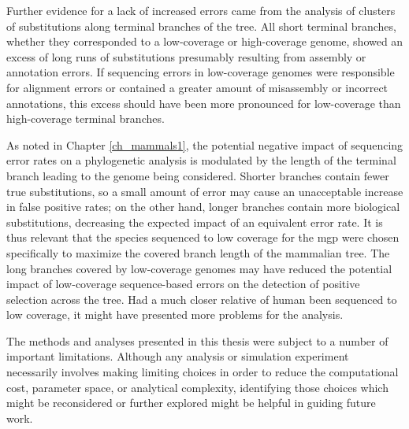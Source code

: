 Further evidence for a lack of increased errors came from the analysis
of clusters of \nsyn substitutions along terminal branches of the
tree. All short terminal branches, whether they corresponded to a
low-coverage or high-coverage genome, showed an excess of long runs of
\nsyn substitutions presumably resulting from assembly or annotation
errors. If sequencing errors in low-coverage genomes were responsible
for alignment errors or contained a greater amount of misassembly or
incorrect annotations, this excess should have been more pronounced
for low-coverage than high-coverage terminal branches.

As noted in Chapter \ref{ch_mammals1}, the potential negative impact
of sequencing error rates on a phylogenetic analysis is modulated by
the length of the terminal branch leading to the genome being
considered. Shorter branches contain fewer true substitutions, so a
small amount of error may cause an unacceptable increase in false
positive rates; on the other hand, longer branches contain more
biological substitutions, decreasing the expected impact of an
equivalent error rate. It is thus relevant that the species sequenced
to low coverage for the \ac{mgp} were chosen specifically to maximize
the covered branch length of the mammalian tree. The long branches
covered by low-coverage genomes may have reduced the potential impact
of low-coverage sequence-based errors on the detection of positive
selection across the tree. Had a much closer relative of human been
sequenced to low coverage, it might have presented more problems for
the analysis.



The methods and analyses presented in this thesis were subject to a
number of important limitations. Although any analysis or simulation
experiment necessarily involves making limiting choices in order to
reduce the computational cost, parameter space, or analytical
complexity, identifying those choices which might be reconsidered or
further explored might be helpful in guiding future work.

